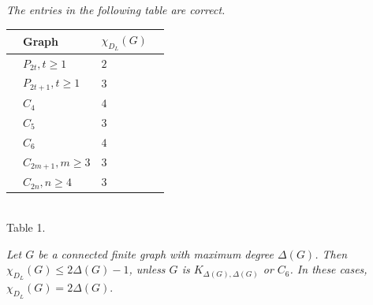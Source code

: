 \documentclass[10pt,a4paper]{amsart}
\begin{document}
\begin{thm}\label{Theorem 2.7}
    {\em The entries in the following table are correct.}
    
\begin{center}
      \begin{tabular}{|ll|l|l|}
        \hline
             & Graph & $\chi_{D_L}(G)$ \\
             \hline\hline
             & $P_{2t}, t\geq 1$ & $2$\\
             & $P_{2t+1}, t\geq 1$ & $3$ \\
             & $C_4$ & $4$ \\
             & $C_5$ & $3$ \\
             & $C_6$ & $4$\\
             & $C_{2m+1}, m\geq 3$  & $3$ \\
             & $C_{2n}, n\geq 4$ & $3$ \\
               
        \hline
        \end{tabular}
        \\
       Table 1. 
        \label{tab:my_label}
    \end{center}  
\end{thm}

\begin{thm}\label{Theorem 3.1}
{\em Let $G$ be a connected finite graph with maximum degree $\Delta(G)$. Then $\chi_{D_{L}}(G)\leq 2\Delta(G)-1$, unless $G$ is  $K_{\Delta(G),\Delta(G)}$ or $C_6$. In these cases, $\chi_{D_{L}}(G) = 2\Delta(G)$}.    
\end{thm}
\end{document}
